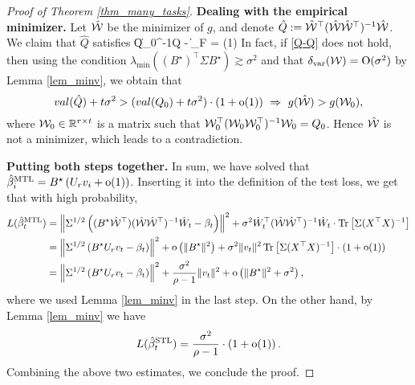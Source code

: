 \begin{proof}[Proof of Theorem \ref{thm_many_tasks}]
	\medskip
	\noindent\textbf{Dealing with the empirical minimizer.}
	Let $\hat {\cal W}$ be the minimizer of $g$, and denote $\hat Q:= \hat{\cal W}^{\top} (\hat{\cal W}\hat{\cal W}^{\top})^{-1} \hat{\cal W} $. We claim that $\hat Q$ satisfies
	\be\label{Q-Q}\|Q_0^{-1}\hat Q - \id\|_F = \oo(1) \quad {}\ee
	In fact, if \eqref{Q-Q} does not hold, then using the condition $\lambda_{\min}((B^{\star})^\top\Sigma B^{\star})\gtrsim \sigma^2$ and that $\delta_{\vari}(\cal W)=\OO(\sigma^2)$ by  Lemma \ref{lem_minv}, we obtain that
	$$   \val(\hat {Q}) + t  \sigma^2 > (\val( Q_0) + t \sigma^2 )\cdot (1+\oo(1)) \ \Rightarrow \ g( \hat{\cal W})>g( {\cal W}_0),$$
	where $\cal W_0\in \R^{r\times t}$ is a matrix such that  $ \cal W_0^{\top} (\cal W_0\cal W_0^{\top})^{-1} \cal W_0=Q_0$. Hence $\hat {\cal W}$ is not a minimizer, which leads to a contradiction.

	\medskip
	\noindent\textbf{Putting both steps together.}
	In sum, we have solved that $\hat{\beta}_i^{\MTL}=B^{\star}\left( U_r v_i +\oo(1)\right)$. Inserting it into the definition of the test loss, we get that with high probability,
	\begin{align*}
		\te(\hat{\beta}_t^{\MTL}) &= \bignorm{\Sigma^{1/2} \left((B^\star \hat{\cal W}^\top) (\hat{\cal W}\hat{\cal W}^{\top})^{-1} \hat W_t - \beta_t \right) }^2
		+ \sigma^2  \hat W_t^{\top} (\hat{\cal W}\hat{\cal W}^{\top})^{-1} \hat W_t \cdot \bigtr{\Sigma (X^{\top}X)^{-1}} \\
		&= \bignorm{\Sigma^{1/2} \bigbrace{B^{\star} U_r v_t-\beta_t}}^2 + \oo\left(\|B^\star\|^2\right) + \sigma^2\norm{v_t}^2 \bigtr{\Sigma (X^{\top}X)^{-1}} \cdot (1+\oo(1))\\
		&= \bignorm{\Sigma^{1/2} \bigbrace{B^{\star} U_r v_t-\beta_t}}^2 + \frac{\sigma^2}{\rho-1}\norm{v_t}^2 + \oo \left( \|B^\star\|^2 + \sigma^2\right),
	\end{align*}
 where we used Lemma \ref{lem_minv} in the last step. On the other hand, by Lemma \ref{lem_minv} we have
	$$\te(\hat{\beta}_t^{\STL})=\frac{\sigma^2}{\rho-1} \cdot \left( 1+\oo(1)\right).$$
Combining the above two estimates, we conclude the proof.
\end{proof}

